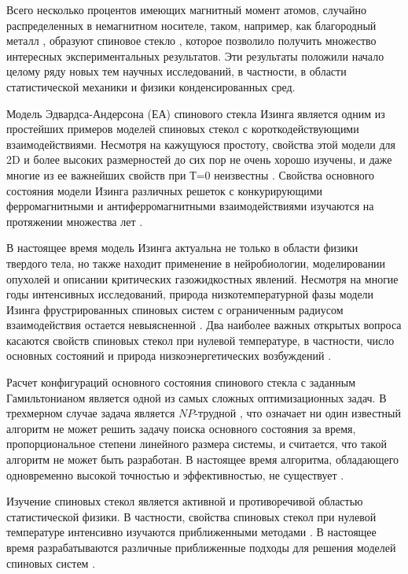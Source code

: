\documentclass[utf8, babel, sor, jor, amsmath, amssymb, reprint]{elsarticle} %
\begin{document}
Всего несколько процентов имеющих магнитный момент атомов, случайно распределенных в немагнитном носителе, таком, например, как благородный металл  \cite{finkler1989spin}, образуют спиновое стекло \cite{belokon2006spin}, которое позволило получить множество интересных экспериментальных результатов. Эти результаты положили начало целому ряду новых тем научных исследований, в частности, в области статистической механики и физики конденсированных сред.

Модель Эдвардса-Андерсона (ЕА) спинового стекла Изинга является одним из простейших примеров моделей спиновых стекол с короткодействующими взаимодействиями. Несмотря на кажущуюся простоту, свойства этой модели для 2D и более высоких размерностей до сих пор не очень хорошо изучены, и даже многие из ее важнейших свойств при Т=0 неизвестны \cite{pal1996ground}. Свойства основного состояния модели Изинга различных решеток с конкурирующими ферромагнитными и антиферромагнитными взаимодействиями изучаются на протяжении множества лет \cite{lebrecht2004plaquette, valdes2012j, lebrecht2015j}. 

В настоящее время модель Изинга актуальна не только в области физики твердого тела, но также находит применение в нейробиологии, моделировании опухолей и описании критических газожидкостных явлений. Несмотря на многие годы интенсивных исследований, природа низкотемпературной фазы модели Изинга фрустрированных спиновых систем с ограниченным радиусом взаимодействия остается невыясненной \cite{newman2023proof}. Два наиболее важных открытых вопроса касаются свойств спиновых стекол при нулевой температуре, в частности, число основных состояний и природа низкоэнергетических возбуждений \cite{newman2022ground}.  

Расчет конфигураций основного состояния спинового стекла с заданным Гамильтонианом является одной из самых сложных оптимизационных задач. В трехмерном случае задача является $NP$-трудной \cite{barahona1982computational, hartmann2002optimization}, что означает ни один известный алгоритм не может решить задачу поиска основного состояния за время, пропорциональное степени линейного размера системы, и считается, что такой алгоритм не может быть разработан. В настоящее время алгоритма, обладающего одновременно высокой точностью и эффективностью, не существует \cite{fan2023searching}.

Изучение спиновых стекол является активной и противоречивой областью статистической физики. В частности, свойства спиновых стекол при нулевой температуре интенсивно изучаются приближенными методами \cite{perez2012ground}. В настоящее время разрабатываются различные приближенные подходы для решения моделей спиновых систем \cite{farias2024differentiable, rybin2022hybrid, makarova2023canonical}. 
\end{document}
